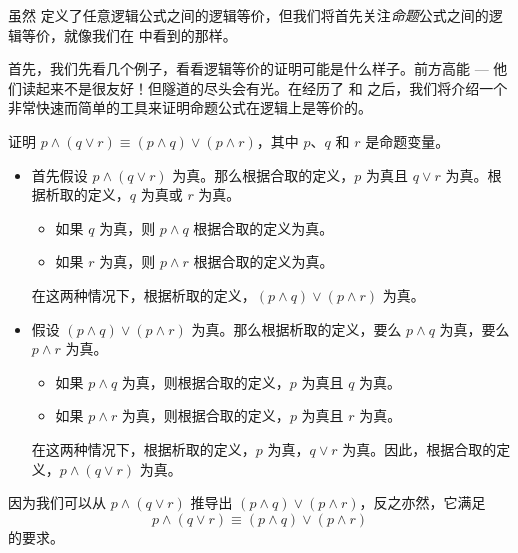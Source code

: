 虽然  定义了任意逻辑公式之间的逻辑等价，但我们将首先关注\textit{命题}公式之间的逻辑等价，就像我们在  中看到的那样。

首先，我们先看几个例子，看看逻辑等价的证明可能是什么样子。前方高能 --- 他们读起来不是很友好！但隧道的尽头会有光。在经历了  和  之后，我们将介绍一个非常快速而简单的工具来证明命题公式在逻辑上是等价的。

\begin{example}
\label{exConjunctionDistributesOverDisjunction}
证明 $p \wedge (q \vee r) \equiv (p \wedge q) \vee (p \wedge r)$，其中 $p$、$q$ 和 $r$ 是命题变量。

\begin{itemize}
\item 首先假设 $p \wedge (q \vee r)$ 为真。那么根据合取的定义，$p$ 为真且 $q \vee r$ 为真。根据析取的定义，$q$ 为真或 $r$ 为真。
\begin{itemize}
\item 如果 $q$ 为真，则 $p \wedge q$ 根据合取的定义为真。
\item 如果 $r$ 为真，则 $p \wedge r$ 根据合取的定义为真。
\end{itemize}
在这两种情况下，根据析取的定义，$(p \wedge q) \vee (p \wedge r)$ 为真。

\item 假设 $(p \wedge q) \vee (p \wedge r)$ 为真。那么根据析取的定义，要么 $p \wedge q$ 为真，要么 $p \wedge r$ 为真。
\begin{itemize}
\item 如果 $p \wedge q$ 为真，则根据合取的定义，$p$ 为真且 $q$ 为真。
\item 如果 $p \wedge r$ 为真，则根据合取的定义，$p$ 为真且 $r$ 为真。
\end{itemize}
在这两种情况下，根据析取的定义，$p$ 为真，$q \vee r$ 为真。因此，根据合取的定义，$p \wedge (q \vee r)$ 为真。
\end{itemize}

因为我们可以从 $p \wedge (q \vee r)$ 推导出 $(p \wedge q) \vee (p \wedge r)$，反之亦然，它满足
\[ p \wedge (q \vee r) \equiv (p \wedge q) \vee (p \wedge r)\]
的要求。
\end{example}


